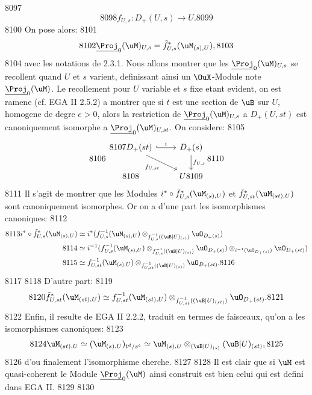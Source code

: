   8097	\[
  8098	f_{U,s} : D_+(U,s) \longrightarrow U.
  8099	\]
  8100	On pose alors:
  8101	\[
  8102	\underline{\Proj}_0(\uM)_{U,s} = \tilde{f}_{U,s}^*(\uM_{(s),U}),
  8103	\]
  8104	avec les notations de 2.3.1. Nous allons montrer que les $\underline{\Proj}_0(\uM)_{U,s}$ se recollent quand $U$ et $s$ varient, definissant ainsi un $\OuX$-Module note $\underline{\Proj}_0(\uM)$. Le recollement pour $U$ variable et $s$ fixe etant evident, on est ramene (cf. EGA II 2.5.2) a montrer que si $t$ est une section de $\uB$ sur $U$, homogene de degre $e > 0$, alors la restriction de $\underline{\Proj}_0(\uM)_{U,s}$ a $D_+(U,st)$ est canoniquement isomorphe a $\underline{\Proj}_0(\uM)_{U,st}$. On considere:
  8105	\[
  8106	\begin{tikzcd}
  8107	D_+(st) \arrow[r, hook, "i"] \arrow[rd, "f_{U,st}"'] & D_+(s) \arrow[d, "f_{U,s}"] \\
  8108	& U
  8109	\end{tikzcd}
  8110	\]
  8111	Il s'agit de montrer que les Modules $i^* \circ \tilde{f}_{U,s}^*(\uM_{(s),U})$ et $\tilde{f}_{U,st}^*(\uM_{(st),U})$ sont canoniquement isomorphes. Or on a d'une part les isomorphismes canoniques:
  8112	\begin{align*}
  8113	i^* \circ \tilde{f}_{U,s}^*(\uM_{(s),U}) &\simeq i^*(f_{U,s}^{-1}(\uM_{(s),U}) \otimes_{f_{U,s}^{-1}((\uB|U)_{(s)})} \uO_{D_+(s)}) \\
  8114	&\simeq i^{-1}(f_{U,s}^{-1}(\uM_{(s),U}) \otimes_{f_{U,s}^{-1}((\uB|U)_{(s)})} \uO_{D_+(s)}) \otimes_{i^{-1}(\uO_{D_+(s)})} \uO_{D_+(st)}) \\
  8115	&\simeq f_{U,st}^{-1}(\uM_{(s),U}) \otimes_{f_{U,st}^{-1}((\uB|U)_{(s)})} \uO_{D_+(st)}.
  8116	\end{align*}
  8117	
  8118	D'autre part:
  8119	\[
  8120	\tilde{f}_{U,st}^*(\uM_{(st),U}) \simeq f_{U,st}^{-1}(\uM_{(st),U}) \otimes_{f_{U,st}^{-1}((\uB|U)_{(st)})} \uO_{D_+(st)}.
  8121	\]
  8122	Enfin, il resulte de EGA II 2.2.2, traduit en termes de faisceaux, qu'on a les isomorphismes canoniques:
  8123	\[
  8124	\uM_{(st),U} \simeq (\uM_{(s),U})_{t^d/s^e} \simeq \uM_{(s),U} \otimes_{(\uB|U)_{(s)}} (\uB|U)_{(st)},
  8125	\]
  8126	d'ou finalement l'isomorphisme cherche.
  8127	
  8128	Il est clair que si $\uM$ est quasi-coherent le Module $\underline{\Proj}_0(\uM)$ ainsi construit est bien celui qui est defini dans EGA II.
  8129	
  8130	\subsubsection{}
